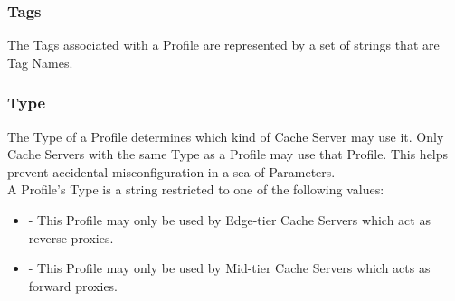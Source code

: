 \subsubsection{Tags}
The Tags associated with a Profile are represented by a set of strings that are
Tag Names.

\subsubsection{Type\label{sec:profile:type}}
The Type of a Profile determines which kind of Cache Server may use it. Only
Cache Servers with the same Type as a Profile may use that Profile. This helps
prevent accidental misconfiguration in a sea of Parameters.\\
A Profile's Type is a string restricted to one of the following values:

\begin{itemize}
	\item {} - This Profile may only be used by Edge-tier Cache
		Servers which act as reverse proxies.
	\item {} - This Profile may only be used by Mid-tier Cache Servers
		which acts as forward proxies.
\end{itemize}
